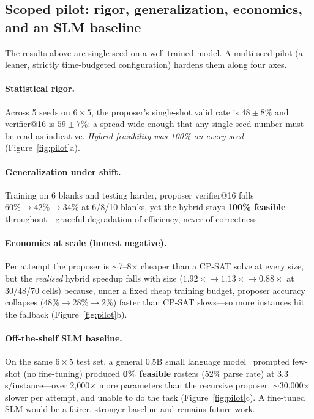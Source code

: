 \documentclass{article}
\begin{document}
\subsection{Scoped pilot: rigor, generalization, economics, and an SLM baseline}
\label{sec:pilot}

The results above are single-seed on a well-trained model. A multi-seed pilot (a
leaner, strictly time-budgeted configuration) hardens them along four axes.

\paragraph{Statistical rigor.} Across 5 seeds on $6\times5$, the proposer's
single-shot valid rate is $48\pm8\%$ and verifier@16 is $59\pm7\%$: a spread wide
enough that any single-seed number must be read as indicative. \emph{Hybrid
feasibility was 100\% on every seed} (Figure~\ref{fig:pilot}a).

\paragraph{Generalization under shift.} Training on 6 blanks and testing harder,
proposer verifier@16 falls $60\%\!\to\!42\%\!\to\!34\%$ at 6/8/10 blanks, yet the
hybrid stays \textbf{100\% feasible} throughout---graceful degradation of
efficiency, never of correctness.

\paragraph{Economics at scale (honest negative).} Per attempt the proposer is
$\sim$7--8$\times$ cheaper than a CP-SAT solve at every size, but the
\emph{realised} hybrid speedup falls with size ($1.92\times\!\to\!1.13\times\!\to\!
0.88\times$ at 30/48/70 cells) because, under a fixed cheap training budget,
proposer accuracy collapses ($48\%\!\to\!28\%\!\to\!2\%$) faster than CP-SAT
slows---so more instances hit the fallback (Figure~\ref{fig:pilot}b).

\paragraph{Off-the-shelf SLM baseline.} On the same $6\times5$ test set, a
general 0.5B small language model~\cite{qwen} prompted few-shot (no fine-tuning)
produced \textbf{0\% feasible} rosters (52\% parse rate) at 3.3 s/instance---over
2{,}000$\times$ more parameters than the recursive proposer, $\sim$30{,}000$\times$
slower per attempt, and unable to do the task (Figure~\ref{fig:pilot}c). A
fine-tuned SLM would be a fairer, stronger baseline and remains future work.
\end{document}
